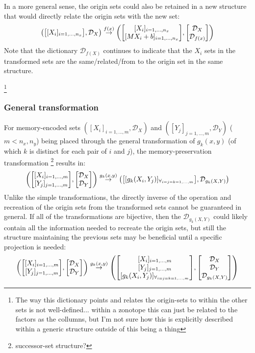 \documentclass[11pt]{article}
\newcommand{\Dict}{\mathcal{D}} %
\begin{document}
In a more general sense, the origin sets could also be retained in a new structure that would directly relate the origin sets with the new set:
\[
	\qty(\mqty[[X_{i}]_{i=1,\dots,n_x}], \Dict_{X})
	\overset{f(x)}{\rightarrow} 
	\qty(\mqty[
		[X_{i}]_{i=1,\dots,n_x}\\
		[M X_{i} + b]_{i=1,\dots,n_x}], 
	\mqty[\Dict_{X}\\ \Dict_{f(x)}]
		)
\]
Note that the dictionary $\Dict_{f(X)}$ continues to indicate that the $X_{i}$ sets in the transformed sets are the same/related/from to the origin set in the same structure.

\footnote{
	The way this dictionary points and relates the origin-sets to within the other sets is not well-defined...
	within a zonotope this can just be related to the factors as the collumns, but I'm not sure how this is explicitly described within a generic structure outside of this being a thing
}

\subsubsection{General transformation}
For memory-encoded sets $([X_{i}]_{i=1,\dots,m}, \Dict_{X})$ and $([Y_{j}]_{j=1,\dots,m}, \Dict_{Y})$ ($m < n_x,n_y$) being placed through the general transformation of $g_{k}(x,y)$ (of which $k$ is distinct for each pair of $i$ and $j$), the memory-preservation transformation \footnote{successor-set structure?} results in:
\[
	\qty(
		\mqty[
			[X_{i}]_{i=1,\dots,m}\\
			[Y_{j}]_{j=1,\dots,m}
		],
		\mqty[\Dict_{X}\\ \Dict_{Y}]
	)
	\overset{g_k(x,y)}{\to}
	\qty(
		\mqty[[g_k(X_{i},Y_{j})]_{\forall_{i=j=k=1,\dots,m}}],
		\Dict_{g_k(X,Y)}
	)
\]
Unlike the simple transformations, the directly inverse of the operation and recreation of the origin sets from the transformed sets cannot be guaranteed in general.
If all of the transformations are bijective, then the $\Dict_{g_k(X,Y)}$ could likely contain all the information needed to recreate the origin sets, but still the structure maintaining the previous sets may be beneficial until a specific projection is needed:
\[
	\qty(
		\mqty[
			[X_{i}]_{i=1,\dots,m}\\
			[Y_{j}]_{j=1,\dots,m}
		],
		\mqty[\Dict_{X}\\ \Dict_{Y}]
	)
	\overset{g_k(x,y)}{\to}
	\qty(
		\mqty[
			[X_{i}]_{i=1,\dots,m}\\
			[Y_{j}]_{j=1,\dots,m}\\
			[g_k(X_{i},Y_{j})]_{\forall_{i=j=k=1,\dots,m}}
		],
		\mqty[
			\Dict_{X}\\ 
			\Dict_{Y}\\ 
			\Dict_{g_k(X,Y)}
		]
	)
\]
\end{document}
